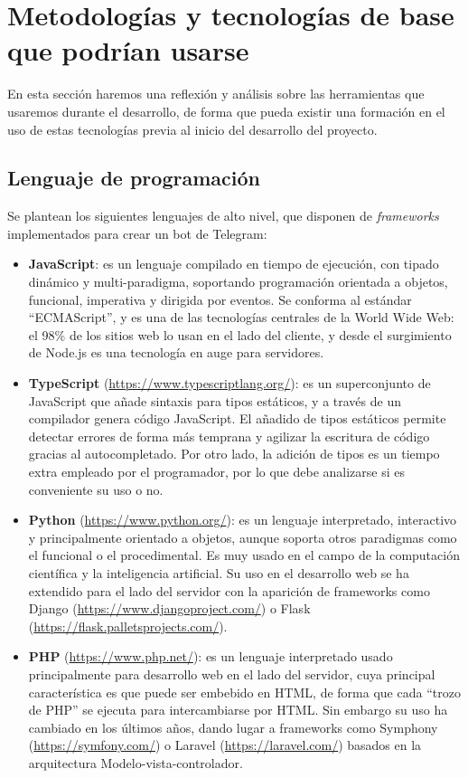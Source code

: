 \setlist[itemize]{}


\section{Metodologías y tecnologías de base que podrían usarse}\label{section:metodologias}

En esta sección haremos una reflexión y análisis sobre las herramientas que usaremos durante el desarrollo, de forma que pueda existir una formación en el uso de estas tecnologías previa al inicio del desarrollo del proyecto.

\subsection{Lenguaje de programación}
Se plantean los siguientes lenguajes de alto nivel, que disponen de \textit{frameworks} implementados para crear un bot de Telegram:

\begin{itemize}
    \item \textbf{JavaScript}: es un lenguaje compilado en tiempo de ejecución, con tipado dinámico y multi-paradigma, soportando programación orientada a objetos, funcional, imperativa y dirigida por eventos\cite{wiki:JavaScript}. Se conforma al estándar ``ECMAScript'', y es una de las tecnologías centrales de la World Wide Web: el 98\% de los sitios web lo usan en el lado del cliente\cite{javascriptUsage}, y desde el surgimiento de Node.js es una tecnología en auge para servidores.
    \item \textbf{TypeScript} (\url{https://www.typescriptlang.org/}): es un superconjunto de JavaScript que añade sintaxis para tipos estáticos, y a través de un compilador genera código JavaScript\cite{typescriptWeb}. El añadido de tipos estáticos permite detectar errores de forma más temprana y agilizar la escritura de código gracias al autocompletado. Por otro lado, la adición de tipos es un tiempo extra empleado por el programador, por lo que debe analizarse si es conveniente su uso o no.
    \item \textbf{Python} (\url{https://www.python.org/}): es un lenguaje interpretado, interactivo y principalmente orientado a objetos, aunque soporta otros paradigmas como el funcional o el procedimental\cite{pythonFAQGeneral}. Es muy usado en el campo de la computación científica y la inteligencia artificial. Su uso en el desarrollo web se ha extendido para el lado del servidor con la aparición de frameworks como Django (\url{https://www.djangoproject.com/}) o Flask (\url{https://flask.palletsprojects.com/}).
    \item \textbf{PHP} (\url{https://www.php.net/}): es un lenguaje interpretado usado principalmente para desarrollo web en el lado del servidor, cuya principal característica es que puede ser embebido en HTML, de forma que cada ``trozo de PHP'' se ejecuta para intercambiarse por HTML. Sin embargo su uso ha cambiado en los últimos años, dando lugar a frameworks como Symphony (\url{https://symfony.com/}) o Laravel (\url{https://laravel.com/}) basados en la arquitectura Modelo-vista-controlador.
\end{itemize}

